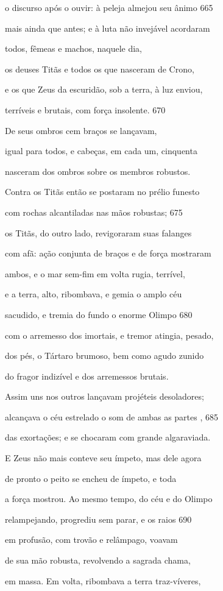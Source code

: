 o discurso após o ouvir: à peleja almejou seu ânimo \num{665}

mais ainda que antes; e à luta não invejável acordaram

todos, fêmeas e machos, naquele dia,

os deuses Titãs e todos os que nasceram de Crono,

e os que Zeus da escuridão, sob a terra, à luz enviou,

terríveis e brutais, com força insolente. \num{670}

De seus ombros cem braços se lançavam,

igual para todos, e cabeças, em cada um, cinquenta

nasceram dos ombros sobre os membros robustos.

Contra os Titãs então se postaram no prélio funesto

com rochas alcantiladas nas mãos robustas; \num{675}

os Titãs, do outro lado, revigoraram suas falanges

com afã: ação conjunta de braços e de força mostraram

ambos, e o mar sem-fim em volta rugia, terrível,

e a terra, alto, ribombava, e gemia o amplo céu

sacudido, e tremia do fundo o enorme Olimpo \num{680}

com o arremesso dos imortais, e tremor atingia, pesado,

dos pés, o Tártaro brumoso, bem como agudo zunido

do fragor indizível e dos arremessos brutais.

Assim uns nos outros lançavam projéteis desoladores;

alcançava o céu estrelado o som de ambas as partes , \num{685}

das exortações; e se chocaram com grande algaraviada.

\quad{}E Zeus não mais conteve seu ímpeto, mas dele agora

de pronto o peito se encheu de ímpeto, e toda

a força mostrou. Ao mesmo tempo, do céu e do Olimpo

relampejando, progrediu sem parar, e os raios \num{690}

em profusão, com trovão e relâmpago, voavam

de sua mão robusta, revolvendo a sagrada chama,

em massa. Em volta, ribombava a terra traz-víveres,

